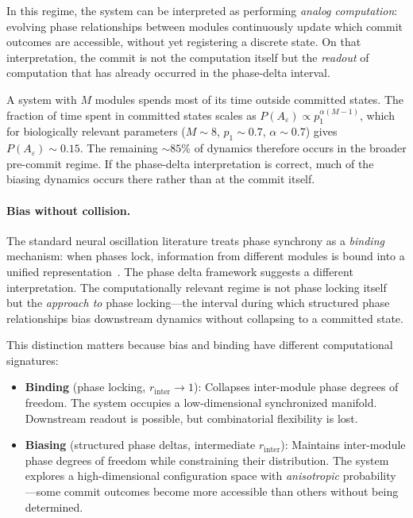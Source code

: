 \documentclass[12pt]{article}
\begin{document}
In this regime, the system can be interpreted as performing \emph{analog computation}: evolving phase relationships between modules continuously update which commit outcomes are accessible, without yet registering a discrete state. On that interpretation, the commit is not the computation itself but the \emph{readout} of computation that has already occurred in the phase-delta interval.

A system with $M$ modules spends most of its time outside committed states. The fraction of time spent in committed states scales as $P(A_\varepsilon) \propto p_1^{\alpha(M-1)}$, which for biologically relevant parameters ($M \sim 8$, $p_1 \sim 0.7$, $\alpha \sim 0.7$) gives $P(A_\varepsilon) \sim 0.15$. The remaining $\sim 85\%$ of dynamics therefore occurs in the broader pre-commit regime. If the phase-delta interpretation is correct, much of the biasing dynamics occurs there rather than at the commit itself.

\paragraph{Bias without collision.} The standard neural oscillation literature treats phase synchrony as a \emph{binding} mechanism: when phases lock, information from different modules is bound into a unified representation~\cite{singer1999,fries2005}. The phase delta framework suggests a different interpretation. The computationally relevant regime is not phase locking itself but the \emph{approach to} phase locking---the interval during which structured phase relationships bias downstream dynamics without collapsing to a committed state.

This distinction matters because bias and binding have different computational signatures:
\begin{itemize}
\item \textbf{Binding} (phase locking, $r_{\mathrm{inter}} \to 1$): Collapses inter-module phase degrees of freedom. The system occupies a low-dimensional synchronized manifold. Downstream readout is possible, but combinatorial flexibility is lost.
\item \textbf{Biasing} (structured phase deltas, intermediate $r_{\mathrm{inter}}$): Maintains inter-module phase degrees of freedom while constraining their distribution. The system explores a high-dimensional configuration space with \emph{anisotropic} probability---some commit outcomes become more accessible than others without being determined.
\end{itemize}
\end{document}
